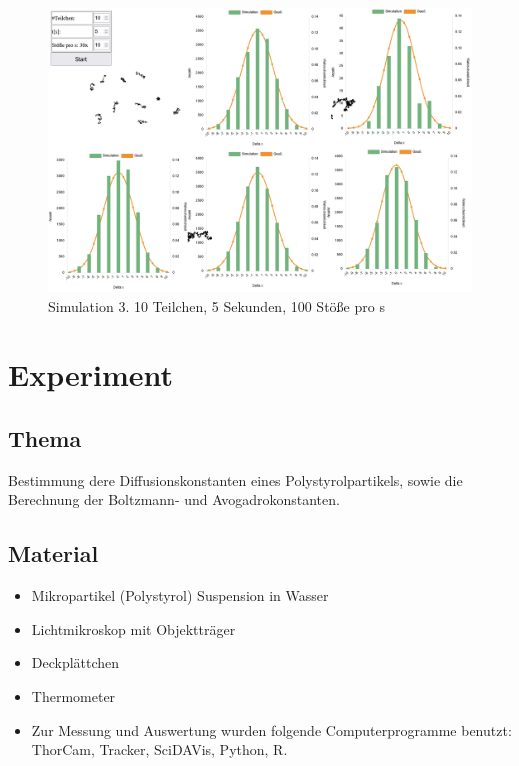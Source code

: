\documentclass[
  9pt,
]{article}
\begin{document}
\begin{figure}
\centering
\includegraphics[width=\textwidth,height=0.1\textheight]{Daten/c.png}
\caption{Simulation 3. 10 Teilchen, 5 Sekunden, 100 Stöße pro s}
\end{figure}

\hypertarget{experiment}{%
\section{Experiment}\label{experiment}}

\hypertarget{thema}{%
\subsection{Thema}\label{thema}}

Bestimmung dere Diffusionskonstanten eines Polystyrolpartikels, sowie
die Berechnung der Boltzmann- und Avogadrokonstanten.

\hypertarget{material}{%
\subsection{Material}\label{material}}

\begin{itemize}
\item{Mikropartikel (Polystyrol) Suspension in Wasser}
\item{Lichtmikroskop mit Objektträger}
\item{Deckplättchen}
\item{Thermometer}
\item{Zur Messung und Auswertung wurden folgende Computerprogramme benutzt: ThorCam, Tracker, SciDAVis, Python, R.}
\end{itemize}
\end{document}
